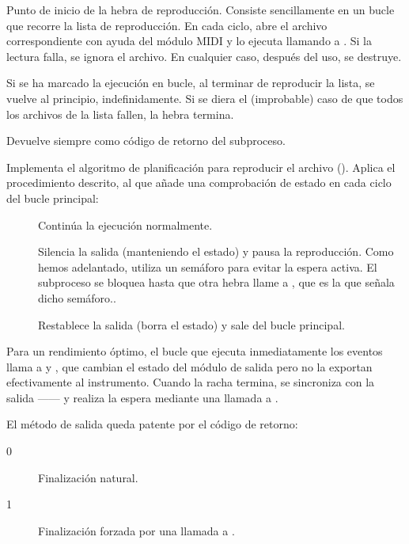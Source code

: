 \begin{description}[style=nextline]
	\item[\code{void* player\_run(void *arg)}]
	Punto de inicio de la hebra de reproducción. Consiste sencillamente en un bucle que recorre la lista de reproducción. En cada ciclo, abre el archivo correspondiente con ayuda del módulo \acrshort{MIDI} y lo ejecuta llamando a . Si la lectura falla, se ignora el archivo. En cualquier caso, después del uso, se destruye.
	
	Si se ha marcado la ejecución en bucle, al terminar de reproducir la lista, se vuelve al principio, indefinidamente. Si se diera el (improbable) caso de que todos los archivos de la lista fallen, la hebra termina.
	
	Devuelve siempre  como código de retorno del subproceso.
	
	\item[\code{int playscore(midifile\_t *file)}]
	
	Implementa el algoritmo de planificación para reproducir el archivo (). Aplica el procedimiento descrito, al que añade una comprobación de estado en cada ciclo del bucle principal:
	
	\begin{description}
		\item[] Continúa la ejecución normalmente.
		
		\item[] Silencia la salida (manteniendo el estado) y pausa la reproducción. Como hemos adelantado, utiliza un semáforo para evitar la espera activa. El subproceso se bloquea hasta que otra hebra llame a , que es la que señala dicho semáforo..
		
		\item[] Restablece la salida (borra el estado) y sale del bucle principal. 
	\end{description}
	
	Para un rendimiento óptimo, el bucle que ejecuta inmediatamente los eventos llama a  y , que cambian el estado del módulo de salida pero no la exportan efectivamente al instrumento. Cuando la racha termina, se sincroniza con la salida ------ y realiza la espera mediante una llamada a .

	El método de salida queda patente por el código de retorno:
	
	\begin{description}
		\item[0] Finalización natural.
		\item[1] Finalización forzada por una llamada a .
	\end{description}
	
\end{description}

